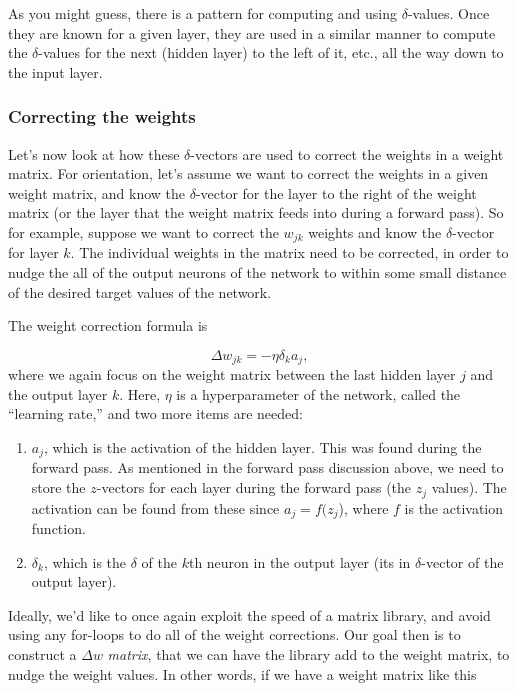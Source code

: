 \documentclass[12pt]{article}
\begin{document}
As you might guess, there is a pattern for computing and using $\delta$-values. Once they are known for a given layer,  they are used in a similar manner to compute the $\delta$-values for the next (hidden layer) to the left of it, etc., all the way down to the input layer.
 
 \subsubsection{Correcting the weights}
 
Let's now look at how these $\delta$-vectors are used to correct the weights in a weight matrix. For orientation, let's assume we want to correct the weights in a given weight matrix, and know the $\delta$-vector for the layer to the right of the weight matrix (or the layer that the weight matrix feeds into during a forward pass).  So for example, suppose we want to correct the $w_{jk}$ weights and know the $\delta$-vector for layer $k$. The individual weights in the matrix need to be corrected, in order to nudge the all of the output neurons of the network to within some small distance of the desired target values of the network. 

The weight correction formula is
 
 \begin{equation}
 \Delta w_{jk}=-\eta\delta_k a_j,
 \end{equation}
 where we again focus on the weight matrix between the last hidden layer $j$ and the output layer $k$. Here, $\eta$ is a hyperparameter of the network, called the ``learning rate,'' and two more items are needed:
 \begin{enumerate}
 \item $a_j$, which is the activation of the hidden layer. This was found during the forward pass.  As mentioned in the forward pass discussion above, we need to store the $z$-vectors for each layer during the forward pass (the $z_j$ values).  The activation can be found from these since $a_j=f(z_j$), where $f$ is the activation function.
 
 \item $\delta_k$, which is the $\delta$ of the $k$th neuron in the output layer (its in $\delta$-vector of the output layer).
 \end{enumerate}
 
 Ideally, we'd like to once again exploit the speed of a matrix library, and avoid using any for-loops to do all of the weight corrections.  Our goal then is to construct a $\Delta w$ \emph{matrix}, that we can have the library add to the weight matrix, to nudge the weight values. In other words, if we have a weight matrix like this
 
\end{document}
